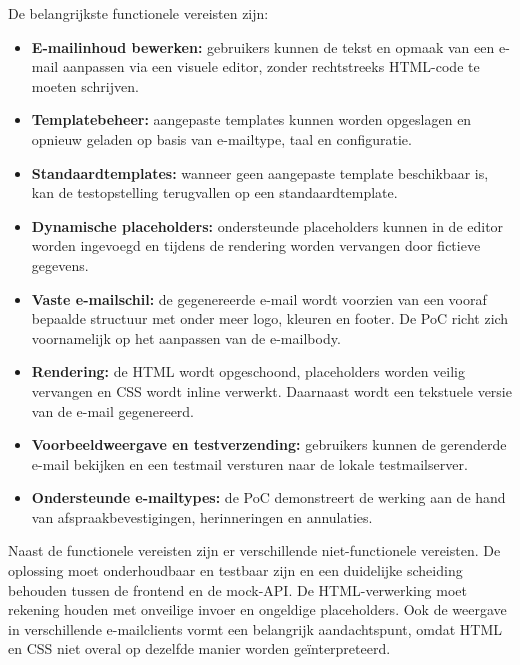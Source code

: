 De belangrijkste functionele vereisten zijn:
\begin{itemize}
    \item \textbf{E-mailinhoud bewerken:} gebruikers kunnen de tekst en
    opmaak van een e-mail aanpassen via een visuele editor, zonder rechtstreeks
    HTML-code te moeten schrijven.

    \item \textbf{Templatebeheer:} aangepaste templates kunnen worden
    opgeslagen en opnieuw geladen op basis van e-mailtype, taal en configuratie.

    \item \textbf{Standaardtemplates:} wanneer geen aangepaste template
    beschikbaar is, kan de testopstelling terugvallen op een standaardtemplate.

    \item \textbf{Dynamische placeholders:} ondersteunde placeholders kunnen
    in de editor worden ingevoegd en tijdens de rendering worden vervangen
    door fictieve gegevens.

    \item \textbf{Vaste e-mailschil:} de gegenereerde e-mail wordt voorzien
    van een vooraf bepaalde structuur met onder meer logo, kleuren en footer.
    De PoC richt zich voornamelijk op het aanpassen van de e-mailbody.

    \item \textbf{Rendering:} de HTML wordt opgeschoond, placeholders worden
    veilig vervangen en CSS wordt inline verwerkt. Daarnaast wordt een
    tekstuele versie van de e-mail gegenereerd.

    \item \textbf{Voorbeeldweergave en testverzending:} gebruikers kunnen
    de gerenderde e-mail bekijken en een testmail versturen naar de lokale
    testmailserver.

    \item \textbf{Ondersteunde e-mailtypes:} de PoC demonstreert de werking
    aan de hand van afspraakbevestigingen, herinneringen en annulaties.
\end{itemize}

Naast de functionele vereisten zijn er verschillende niet-functionele
vereisten. De oplossing moet onderhoudbaar en testbaar zijn en een duidelijke
scheiding behouden tussen de frontend en de mock-API. De HTML-verwerking moet
rekening houden met onveilige invoer en ongeldige placeholders. Ook de
weergave in verschillende e-mailclients vormt een belangrijk aandachtspunt,
omdat HTML en CSS niet overal op dezelfde manier worden geïnterpreteerd.

